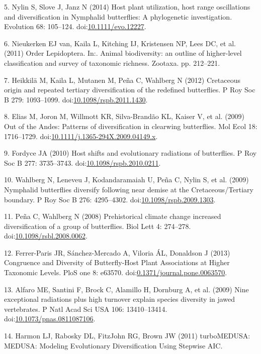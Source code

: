 \documentclass[10pt]{article}
\begin{document}
5. Nylin S, Slove J, Janz N (2014) Host plant utilization, host range
oscillations and diversification in Nymphalid butterflies: A
phylogenetic investigation. Evolution 68: 105--124.
doi:\href{http://dx.doi.org/10.1111/evo.12227}{10.1111/evo.12227}.

6. Nieukerken EJ van, Kaila L, Kitching IJ, Kristensen NP, Lees DC, et
al. (2011) Order Lepidoptera. In:. Animal biodiversity: an outline of
higher-level classification and survey of taxonomic richness. Zootaxa.
pp. 212--221.

7. Heikkilä M, Kaila L, Mutanen M, Peña C, Wahlberg N (2012) Cretaceous
origin and repeated tertiary diversification of the redefined
butterflies. P Roy Soc B 279: 1093--1099.
doi:\href{http://dx.doi.org/10.1098/rspb.2011.1430}{10.1098/rspb.2011.1430}.

8. Elias M, Joron M, Willmott KR, Silva-Brandão KL, Kaiser V, et al.
(2009) Out of the Andes: Patterns of diversification in clearwing
butterflies. Mol Ecol 18: 1716--1729.
doi:\href{http://dx.doi.org/10.1111/j.1365-294X.2009.04149.x}{10.1111/j.1365-294X.2009.04149.x}.

9. Fordyce JA (2010) Host shifts and evolutionary radiations of
butterflies. P Roy Soc B 277: 3735--3743.
doi:\href{http://dx.doi.org/10.1098/rspb.2010.0211}{10.1098/rspb.2010.0211}.

10. Wahlberg N, Leneveu J, Kodandaramaiah U, Peña C, Nylin S, et al.
(2009) Nymphalid butterflies diversify following near demise at the
Cretaceous/Tertiary boundary. P Roy Soc B 276: 4295--4302.
doi:\href{http://dx.doi.org/10.1098/rspb.2009.1303}{10.1098/rspb.2009.1303}.

11. Peña C, Wahlberg N (2008) Prehistorical climate change increased
diversification of a group of butterflies. Biol Lett 4: 274--278.
doi:\href{http://dx.doi.org/10.1098/rsbl.2008.0062}{10.1098/rsbl.2008.0062}.

12. Ferrer-Paris JR, S\'anchez-Mercado A, Viloria ÁL, Donaldson J (2013)
Congruence and Diversity of Butterfly-Host Plant Associations at Higher
Taxonomic Levels. PloS one 8: e63570.
doi:\href{http://dx.doi.org/0.1371/journal.pone.0063570}{0.1371/journal.pone.0063570}.

13. Alfaro ME, Santini F, Brock C, Alamillo H, Dornburg A, et al. (2009)
Nine exceptional radiations plus high turnover explain species diversity
in jawed vertebrates. P Natl Acad Sci USA 106: 13410--13414.
doi:\href{http://dx.doi.org/10.1073/pnas.0811087106}{10.1073/pnas.0811087106}.

14. Harmon LJ, Rabosky DL, FitzJohn RG, Brown JW (2011) turboMEDUSA:
MEDUSA: Modeling Evolutionary Diversification Using Stepwise AIC.
\end{document}
